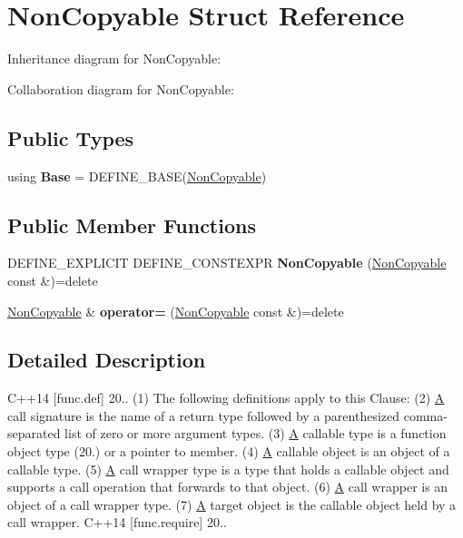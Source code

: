 \hypertarget{struct_non_copyable}{}\section{Non\+Copyable Struct Reference}
\label{struct_non_copyable}


Inheritance diagram for Non\+Copyable\+:


Collaboration diagram for Non\+Copyable\+:
\subsection*{Public Types}
\begin{DoxyCompactItemize}
\item 
\mbox{\label{struct_non_copyable_a9ab657d2716b0586ff951a189c4b0ca2}} 
using {\bfseries Base} = D\+E\+F\+I\+N\+E\+\_\+\+B\+A\+SE(\mbox{\hyperlink{struct_non_copyable}{Non\+Copyable}})
\end{DoxyCompactItemize}
\subsection*{Public Member Functions}
\begin{DoxyCompactItemize}
\item 
\mbox{\label{struct_non_copyable_a2d035a85a669fdd40b018294aef63d9e}} 
D\+E\+F\+I\+N\+E\+\_\+\+E\+X\+P\+L\+I\+C\+IT D\+E\+F\+I\+N\+E\+\_\+\+C\+O\+N\+S\+T\+E\+X\+PR {\bfseries Non\+Copyable} (\mbox{\hyperlink{struct_non_copyable}{Non\+Copyable}} const \&)=delete
\item 
\mbox{\label{struct_non_copyable_ae295d8133e0b45bad478982d2616db04}} 
\mbox{\hyperlink{struct_non_copyable}{Non\+Copyable}} \& {\bfseries operator=} (\mbox{\hyperlink{struct_non_copyable}{Non\+Copyable}} const \&)=delete
\end{DoxyCompactItemize}


\subsection{Detailed Description}
C++14 \mbox{[}func.\+def\mbox{]} 20.. (1) The following definitions apply to this Clause\+: (2) \mbox{\hyperlink{struct_a}{A}} call signature is the name of a return type followed by a parenthesized comma-\/separated list of zero or more argument types. (3) \mbox{\hyperlink{struct_a}{A}} callable type is a function object type (20.) or a pointer to member. (4) \mbox{\hyperlink{struct_a}{A}} callable object is an object of a callable type. (5) \mbox{\hyperlink{struct_a}{A}} call wrapper type is a type that holds a callable object and supports a call operation that forwards to that object. (6) \mbox{\hyperlink{struct_a}{A}} call wrapper is an object of a call wrapper type. (7) \mbox{\hyperlink{struct_a}{A}} target object is the callable object held by a call wrapper. C++14 \mbox{[}func.\+require\mbox{]} 20..

